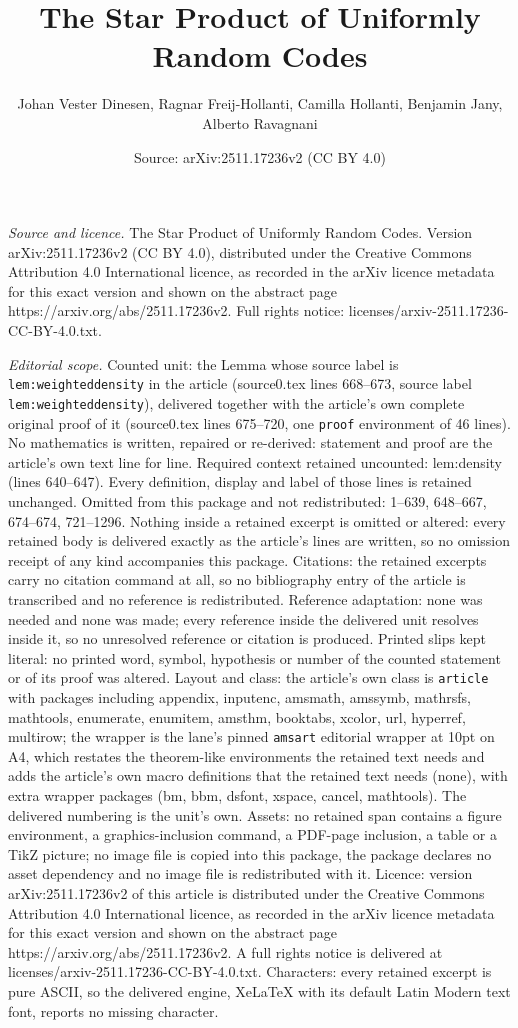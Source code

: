 \documentclass[10pt,a4paper]{amsart}
\title[The Star Product of Uniformly Random Codes]{The Star Product of Uniformly Random Codes}
\author{Johan Vester Dinesen, Ragnar Freij-Hollanti, Camilla Hollanti, Benjamin Jany, Alberto Ravagnani}
\date{Source: arXiv:2511.17236v2 (CC BY 4.0)}
\begin{document}
\maketitle

\noindent\emph{Source and licence.} The Star Product of Uniformly Random Codes. Version arXiv:2511.17236v2 (CC BY 4.0), distributed under the Creative Commons Attribution 4.0 International licence, as recorded in the arXiv licence metadata for this exact version and shown on the abstract page https://arxiv.org/abs/2511.17236v2. Full rights notice: licenses/arxiv-2511.17236-CC-BY-4.0.txt.\par\smallskip

\noindent\textit{Editorial scope.} Counted unit: the Lemma whose source label is \texttt{lem:weighteddensity} in the article (source0.tex lines 668--673, source label \texttt{lem:weighteddensity}), delivered together with the article's own complete original proof of it (source0.tex lines 675--720, one \texttt{proof} environment of 46 lines). No mathematics is written, repaired or re-derived: statement and proof are the article's own text line for line. Required context retained uncounted: lem:density (lines 640--647). Every definition, display and label of those lines is retained unchanged. Omitted from this package and not redistributed: 1--639, 648--667, 674--674, 721--1296. Nothing inside a retained excerpt is omitted or altered: every retained body is delivered exactly as the article's lines are written, so no omission receipt of any kind accompanies this package. Citations: the retained excerpts carry no citation command at all, so no bibliography entry of the article is transcribed and no reference is redistributed. Reference adaptation: none was needed and none was made; every reference inside the delivered unit resolves inside it, so no unresolved reference or citation is produced. Printed slips kept literal: no printed word, symbol, hypothesis or number of the counted statement or of its proof was altered. Layout and class: the article's own class is \texttt{article} with packages including appendix, inputenc, amsmath, amssymb, mathrsfs, mathtools, enumerate, enumitem, amsthm, booktabs, xcolor, url, hyperref, multirow; the wrapper is the lane's pinned \texttt{amsart} editorial wrapper at 10pt on A4, which restates the theorem-like environments the retained text needs and adds the article's own macro definitions that the retained text needs (none), with extra wrapper packages (bm, bbm, dsfont, xspace, cancel, mathtools). The delivered numbering is the unit's own. Assets: no retained span contains a figure environment, a graphics-inclusion command, a PDF-page inclusion, a table or a TikZ picture; no image file is copied into this package, the package declares no asset dependency and no image file is redistributed with it. Licence: version arXiv:2511.17236v2 of this article is distributed under the Creative Commons Attribution 4.0 International licence, as recorded in the arXiv licence metadata for this exact version and shown on the abstract page https://arxiv.org/abs/2511.17236v2. A full rights notice is delivered at licenses/arxiv-2511.17236-CC-BY-4.0.txt. Characters: every retained excerpt is pure ASCII, so the delivered engine, XeLaTeX with its default Latin Modern text font, reports no missing character.
\end{document}
